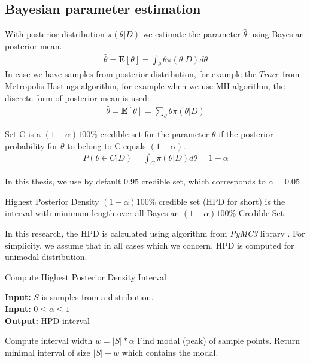 \subsection{Bayesian parameter estimation}
With posterior distribution $\pi(\theta|D)$ we estimate the parameter $\hat{\theta}$ using Bayesian
posterior mean.
\begin{align*}
    \hat{\theta} = \mathbf{E}[\theta] = \int_\theta \theta \pi(\theta|D) d\theta
\end{align*}
In case we have samples from posterior distribution, for example the $Trace$
from Metropolis-Hastings algorithm, for example when we use MH algorithm, the
discrete form of posterior mean is used:
\begin{align*}
    \hat{\theta} = \mathbf{E}[\theta] = \sum_\theta \theta \pi(\theta|D)
\end{align*}

\begin{definition}
    Set C is a $(1 − \alpha )100\%$ credible set for the parameter $\theta$ if the posterior
    probability for $\theta$ to belong to C equals $(1 − \alpha)$.
    \begin{align*}
        P(\theta \in C | D) = \int_C \pi(\theta|D) d\theta = 1 - \alpha
    \end{align*}
\end{definition}
In this thesis, we use by default $0.95$ credible set, which corresponds to $\alpha=0.05$

\begin{definition}
    Highest Posterior Density $(1-\alpha)100\%$ credible set (HPD for short) is the
    interval with minimum length over all Bayesian $(1-\alpha)100\%$ Credible Set.
\end{definition}

In this research, the HPD is calculated using algorithm from \textit{PyMC3}
library \cite{salvatier2016pymc3}. For simplicity, we assume that in all cases which we concern,
HPD is computed for unimodal distribution.
\begin{algorithm}[H]
    \caption{Compute Highest Posterior Density Interval}
    \label{mh}
    \hspace*{\algorithmicindent} \textbf{Input:} $S$ is samples from a distribution. \\
    \hspace*{\algorithmicindent} \textbf{Input:} $0\leq \alpha \leq 1$ \\
    \hspace*{\algorithmicindent} \textbf{Output:} HPD interval
    \begin{algorithmic}[1]
        \State Compute interval width $w = |S| * \alpha$
        \State Find modal (peak) of sample points.
        \State Return minimal interval of size $|S| - w$ which contains the modal.
        \EndProcedure
    \end{algorithmic}
\end{algorithm}

